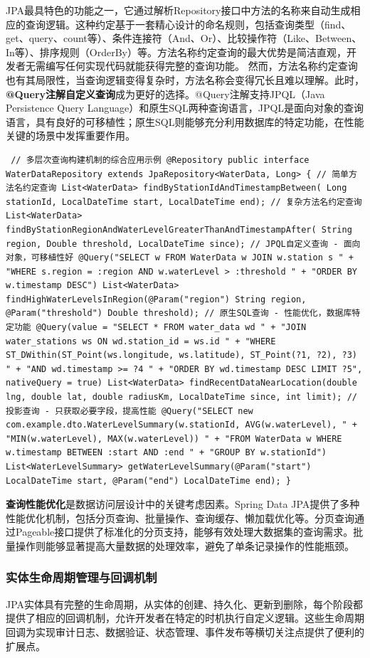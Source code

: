 JPA最具特色的功能之一，它通过解析Repository接口中方法的名称来自动生成相应的查询逻辑。这种约定基于一套精心设计的命名规则，包括查询类型（find、get、query、count等）、条件连接符（And、Or）、比较操作符（Like、Between、In等）、排序规则（OrderBy）等。方法名称约定查询的最大优势是简洁直观，开发者无需编写任何实现代码就能获得完整的查询功能。 然而，方法名称约定查询也有其局限性，当查询逻辑变得复杂时，方法名称会变得冗长且难以理解。此时，\textbf{@Query注解自定义查询}成为更好的选择。@Query注解支持JPQL（Java Persistence Query Language）和原生SQL两种查询语言，JPQL是面向对象的查询语言，具有良好的可移植性；原生SQL则能够充分利用数据库的特定功能，在性能关键的场景中发挥重要作用。 \begin{verbatim} // 多层次查询构建机制的综合应用示例 @Repository public interface WaterDataRepository extends JpaRepository<WaterData, Long> { // 简单方法名约定查询 List<WaterData> findByStationIdAndTimestampBetween( Long stationId, LocalDateTime start, LocalDateTime end); // 复杂方法名约定查询 List<WaterData> findByStationRegionAndWaterLevelGreaterThanAndTimestampAfter( String region, Double threshold, LocalDateTime since); // JPQL自定义查询 - 面向对象，可移植性好 @Query("SELECT w FROM WaterData w JOIN w.station s " + "WHERE s.region = :region AND w.waterLevel > :threshold " + "ORDER BY w.timestamp DESC") List<WaterData> findHighWaterLevelsInRegion(@Param("region") String region, @Param("threshold") Double threshold); // 原生SQL查询 - 性能优化，数据库特定功能 @Query(value = "SELECT * FROM water_data wd " + "JOIN water_stations ws ON wd.station_id = ws.id " + "WHERE ST_DWithin(ST_Point(ws.longitude, ws.latitude), ST_Point(?1, ?2), ?3) " + "AND wd.timestamp >= ?4 " + "ORDER BY wd.timestamp DESC LIMIT ?5", nativeQuery = true) List<WaterData> findRecentDataNearLocation(double lng, double lat, double radiusKm, LocalDateTime since, int limit); // 投影查询 - 只获取必要字段，提高性能 @Query("SELECT new com.example.dto.WaterLevelSummary(w.stationId, AVG(w.waterLevel), " + "MIN(w.waterLevel), MAX(w.waterLevel)) " + "FROM WaterData w WHERE w.timestamp BETWEEN :start AND :end " + "GROUP BY w.stationId") List<WaterLevelSummary> getWaterLevelSummary(@Param("start") LocalDateTime start, @Param("end") LocalDateTime end); } \end{verbatim} \textbf{查询性能优化}是数据访问层设计中的关键考虑因素。Spring Data JPA提供了多种性能优化机制，包括分页查询、批量操作、查询缓存、懒加载优化等。分页查询通过Pageable接口提供了标准化的分页支持，能够有效处理大数据集的查询需求。批量操作则能够显著提高大量数据的处理效率，避免了单条记录操作的性能瓶颈。 \subsubsection{实体生命周期管理与回调机制}\label{ux5b9eux4f53ux751fux547dux5468ux671fux7ba1ux7406ux4e0eux56deux8c03ux673aux5236} JPA实体具有完整的生命周期，从实体的创建、持久化、更新到删除，每个阶段都提供了相应的回调机制，允许开发者在特定的时机执行自定义逻辑。这些生命周期回调为实现审计日志、数据验证、状态管理、事件发布等横切关注点提供了便利的扩展点。 